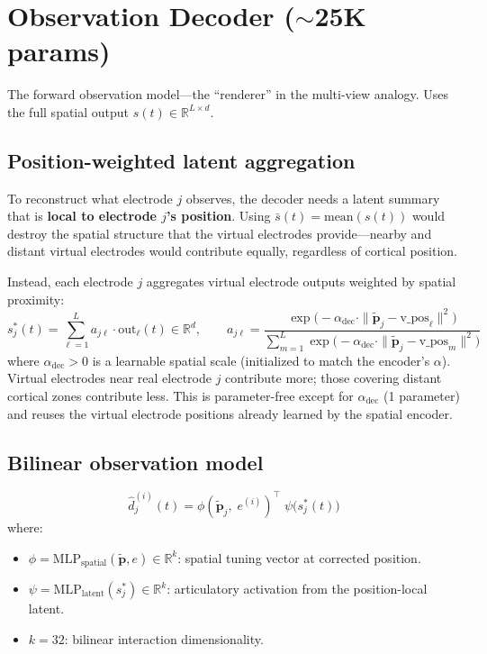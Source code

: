 \documentclass[11pt,letterpaper]{article}
\newcommand{\bfp}{\mathbf{p}}
\newcommand{\R}{\mathbb{R}}
\begin{document}
\section{Observation Decoder (\texorpdfstring{${\sim}$25K}{~25K} params)}\label{sec:obs-decoder}

The forward observation model---the ``renderer'' in the multi-view analogy. Uses the full spatial output $s(t) \in \R^{L \times d}$.

\subsection{Position-weighted latent aggregation}

To reconstruct what electrode $j$ observes, the decoder needs a latent summary that is \textbf{local to electrode $j$'s position}. Using $\bar{s}(t) = \text{mean}(s(t))$ would destroy the spatial structure that the virtual electrodes provide---nearby and distant virtual electrodes would contribute equally, regardless of cortical position.

Instead, each electrode $j$ aggregates virtual electrode outputs weighted by spatial proximity:
\begin{equation}\label{eq:local-agg}
s_j^*(t) = \sum_{\ell=1}^{L} a_{j\ell} \cdot \text{out}_\ell(t) \in \R^d, \qquad
a_{j\ell} = \frac{\exp\bigl(-\alpha_{\text{dec}} \cdot \|\tilde{\bfp}_j - \text{v\_pos}_\ell\|^2\bigr)}
             {\sum_{m=1}^L \exp\bigl(-\alpha_{\text{dec}} \cdot \|\tilde{\bfp}_j - \text{v\_pos}_m\|^2\bigr)}
\end{equation}
where $\alpha_{\text{dec}} > 0$ is a learnable spatial scale (initialized to match the encoder's $\alpha$).
Virtual electrodes near real electrode $j$ contribute more; those covering distant cortical zones contribute less.
This is parameter-free except for $\alpha_{\text{dec}}$ (1 parameter) and reuses the virtual electrode positions already learned by the spatial encoder.

\subsection{Bilinear observation model}

\begin{equation}\label{eq:bilinear}
\boxed{\hat{d}_j^{(i)}(t) = \phi(\tilde{\bfp}_j,\; e^{(i)})^\top \;\psi\bigl(s_j^*(t)\bigr)}
\end{equation}
where:
\begin{itemize}[leftmargin=2em]
\item $\phi = \text{MLP}_{\text{spatial}}(\tilde{\bfp}, e) \in \R^k$: spatial tuning vector at corrected position.
\item $\psi = \text{MLP}_{\text{latent}}(s_j^*) \in \R^k$: articulatory activation from the position-local latent.
\item $k = 32$: bilinear interaction dimensionality.
\end{itemize}
\end{document}
